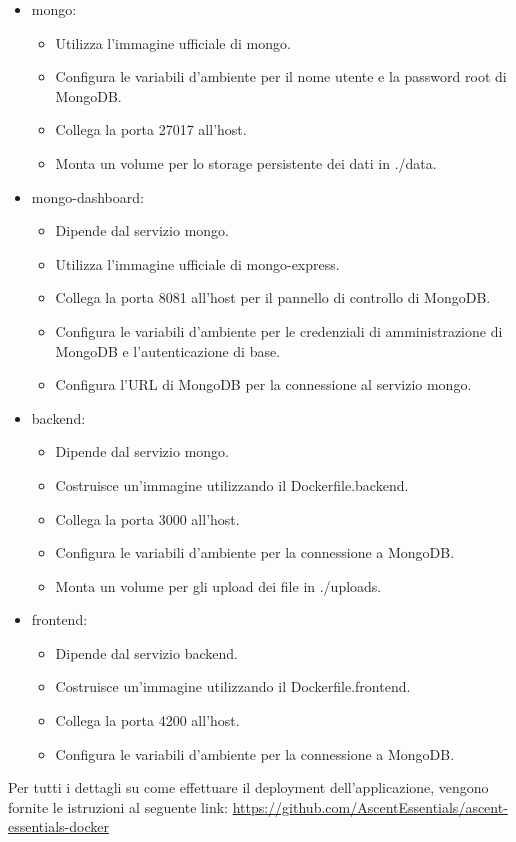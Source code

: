 \begin{itemize}
    \item mongo:
    \begin{itemize}
        \item Utilizza l'immagine ufficiale di mongo.
        \item Configura le variabili d'ambiente per il nome utente e la password root di MongoDB.
        \item Collega la porta 27017 all'host.
        \item Monta un volume per lo storage persistente dei dati in ./data.
    \end{itemize}
    \item mongo-dashboard:
    \begin{itemize}
        \item Dipende dal servizio mongo.
        \item Utilizza l'immagine ufficiale di mongo-express.
        \item Collega la porta 8081 all'host per il pannello di controllo di MongoDB.
        \item Configura le variabili d'ambiente per le credenziali di amministrazione di MongoDB e l'autenticazione di base.
        \item Configura l'URL di MongoDB per la connessione al servizio mongo.
    \end{itemize}
    \item backend:
    \begin{itemize}
        \item Dipende dal servizio mongo.
        \item Costruisce un'immagine utilizzando il Dockerfile.backend.
        \item Collega la porta 3000 all'host.
        \item Configura le variabili d'ambiente per la connessione a MongoDB.
        \item Monta un volume per gli upload dei file in ./uploads.
    \end{itemize}
    \item frontend:
    \begin{itemize}
        \item Dipende dal servizio backend.
        \item Costruisce un'immagine utilizzando il Dockerfile.frontend.
        \item Collega la porta 4200 all'host.
        \item Configura le variabili d'ambiente per la connessione a MongoDB.
    \end{itemize}
\end{itemize}

Per tutti i dettagli su come effettuare il deployment dell'applicazione, vengono fornite le istruzioni al seguente link: \url{https://github.com/AscentEssentials/ascent-essentials-docker}
